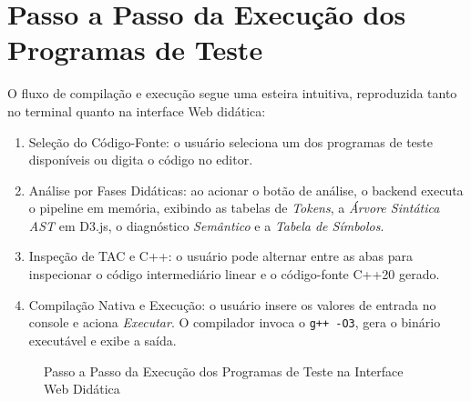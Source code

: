 \section{Passo a Passo da Execução dos Programas de Teste}

O fluxo de compilação e execução segue uma esteira intuitiva, reproduzida tanto no terminal quanto na interface Web didática:

\begin{enumerate}
    \item Seleção do Código-Fonte: o usuário seleciona um dos programas de teste disponíveis ou digita o código no editor.
    \item Análise por Fases Didáticas: ao acionar o botão de análise, o backend executa o pipeline em memória, exibindo as tabelas de \textit{Tokens}, a \textit{Árvore Sintática AST} em D3.js, o diagnóstico \textit{Semântico} e a \textit{Tabela de Símbolos}.
    \item Inspeção de TAC e C++: o usuário pode alternar entre as abas para inspecionar o código intermediário linear e o código-fonte C++20 gerado.
    \item Compilação Nativa e Execução: o usuário insere os valores de entrada no console e aciona \textit{Executar}. O compilador invoca o \texttt{g++ -O3}, gera o binário executável e exibe a saída.
\end{enumerate}

\begin{figure}[htbp]
    \centering
    \caption{Passo a Passo da Execução dos Programas de Teste na Interface Web Didática}
    \label{fig:passo_a_passo_web}
\end{figure}
